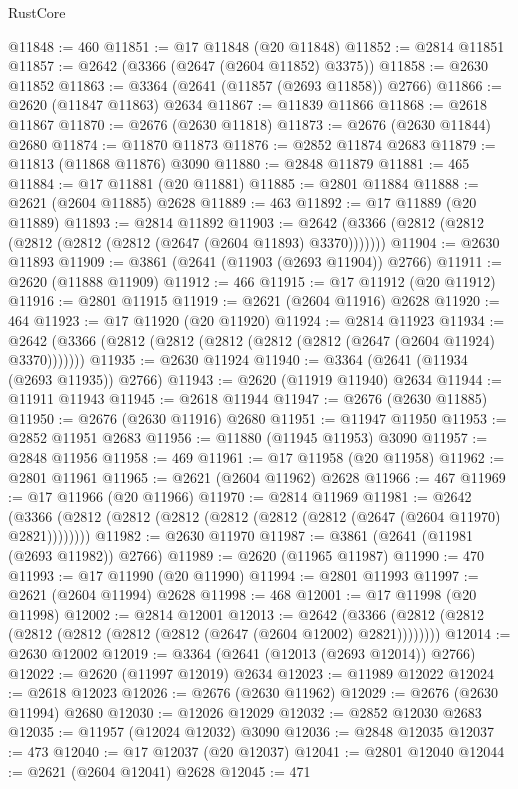\begin{lexlean}{RustCore}
\begin{coremodule}
@11848 := 460
@11851 := @17 @11848 (@20 @11848)
@11852 := @2814 @11851
@11857 := @2642 (@3366 (@2647 (@2604 @11852) @3375))
@11858 := @2630 @11852
@11863 := @3364 (@2641 (@11857 (@2693 @11858)) @2766)
@11866 := @2620 (@11847 @11863) @2634
@11867 := @11839 @11866
@11868 := @2618 @11867
@11870 := @2676 (@2630 @11818)
@11873 := @2676 (@2630 @11844) @2680
@11874 := @11870 @11873
@11876 := @2852 @11874 @2683
@11879 := @11813 (@11868 @11876) @3090
@11880 := @2848 @11879
@11881 := 465
@11884 := @17 @11881 (@20 @11881)
@11885 := @2801 @11884
@11888 := @2621 (@2604 @11885) @2628
@11889 := 463
@11892 := @17 @11889 (@20 @11889)
@11893 := @2814 @11892
@11903 := @2642 (@3366 (@2812 (@2812 (@2812 (@2812 (@2812 (@2647 (@2604 @11893) @3370)))))))
@11904 := @2630 @11893
@11909 := @3861 (@2641 (@11903 (@2693 @11904)) @2766)
@11911 := @2620 (@11888 @11909)
@11912 := 466
@11915 := @17 @11912 (@20 @11912)
@11916 := @2801 @11915
@11919 := @2621 (@2604 @11916) @2628
@11920 := 464
@11923 := @17 @11920 (@20 @11920)
@11924 := @2814 @11923
@11934 := @2642 (@3366 (@2812 (@2812 (@2812 (@2812 (@2812 (@2647 (@2604 @11924) @3370)))))))
@11935 := @2630 @11924
@11940 := @3364 (@2641 (@11934 (@2693 @11935)) @2766)
@11943 := @2620 (@11919 @11940) @2634
@11944 := @11911 @11943
@11945 := @2618 @11944
@11947 := @2676 (@2630 @11885)
@11950 := @2676 (@2630 @11916) @2680
@11951 := @11947 @11950
@11953 := @2852 @11951 @2683
@11956 := @11880 (@11945 @11953) @3090
@11957 := @2848 @11956
@11958 := 469
@11961 := @17 @11958 (@20 @11958)
@11962 := @2801 @11961
@11965 := @2621 (@2604 @11962) @2628
@11966 := 467
@11969 := @17 @11966 (@20 @11966)
@11970 := @2814 @11969
@11981 := @2642 (@3366 (@2812 (@2812 (@2812 (@2812 (@2812 (@2812 (@2647 (@2604 @11970) @2821))))))))
@11982 := @2630 @11970
@11987 := @3861 (@2641 (@11981 (@2693 @11982)) @2766)
@11989 := @2620 (@11965 @11987)
@11990 := 470
@11993 := @17 @11990 (@20 @11990)
@11994 := @2801 @11993
@11997 := @2621 (@2604 @11994) @2628
@11998 := 468
@12001 := @17 @11998 (@20 @11998)
@12002 := @2814 @12001
@12013 := @2642 (@3366 (@2812 (@2812 (@2812 (@2812 (@2812 (@2812 (@2647 (@2604 @12002) @2821))))))))
@12014 := @2630 @12002
@12019 := @3364 (@2641 (@12013 (@2693 @12014)) @2766)
@12022 := @2620 (@11997 @12019) @2634
@12023 := @11989 @12022
@12024 := @2618 @12023
@12026 := @2676 (@2630 @11962)
@12029 := @2676 (@2630 @11994) @2680
@12030 := @12026 @12029
@12032 := @2852 @12030 @2683
@12035 := @11957 (@12024 @12032) @3090
@12036 := @2848 @12035
@12037 := 473
@12040 := @17 @12037 (@20 @12037)
@12041 := @2801 @12040
@12044 := @2621 (@2604 @12041) @2628
@12045 := 471

\end{coremodule}
\end{lexlean}
